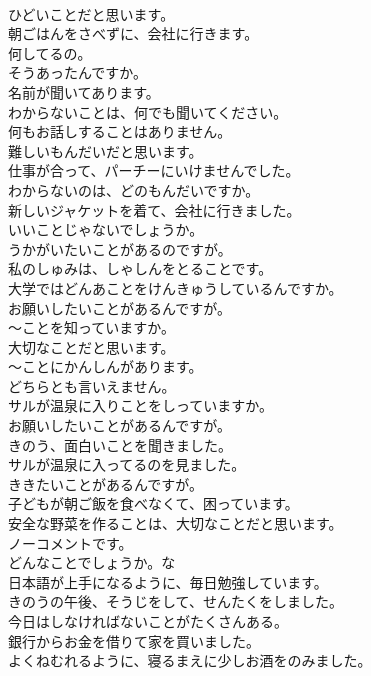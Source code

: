 \documentclass[8pt]{extreport}
\begin{document}
\begin{CJK}{UTF8}{min}
\\	ひどいことだと思います。
\\	朝ごはんをさべずに、会社に行きます。
\\	何してるの。
\\	そうあったんですか。
\\	名前が聞いてあります。
\\	わからないことは、何でも聞いてください。
\\	何もお話しすることはありません。
\\	難しいもんだいだと思います。
\\	仕事が合って、パーチーにいけませんでした。
\\	わからないのは、どのもんだいですか。
\\	新しいジャケットを着て、会社に行きました。
\\	いいことじゃないでしょうか。
\\	うかがいたいことがあるのですが。
\\	私のしゅみは、しゃしんをとることです。
\\	大学ではどんあことをけんきゅうしているんですか。
\\	お願いしたいことがあるんですが。
\\	～ことを知っていますか。
\\	大切なことだと思います。
\\	～ことにかんしんがあります。
\\	どちらとも言いえません。
\\	サルが温泉に入りことをしっていますか。
\\	お願いしたいことがあるんですが。
\\	きのう、面白いことを聞きました。
\\	サルが温泉に入ってるのを見ました。
\\	ききたいことがあるんですが。
\\	子どもが朝ご飯を食べなくて、困っています。
\\	安全な野菜を作ることは、大切なことだと思います。
\\	ノーコメントです。
\\	どんなことでしょうか。な
\\	日本語が上手になるように、毎日勉強しています。
\\	きのうの午後、そうじをして、せんたくをしました。
\\	今日はしなければないことがたくさんある。
\\	銀行からお金を借りて家を買いました。
\\	よくねむれるように、寝るまえに少しお酒をのみました。

\end{CJK}
\end{document}
